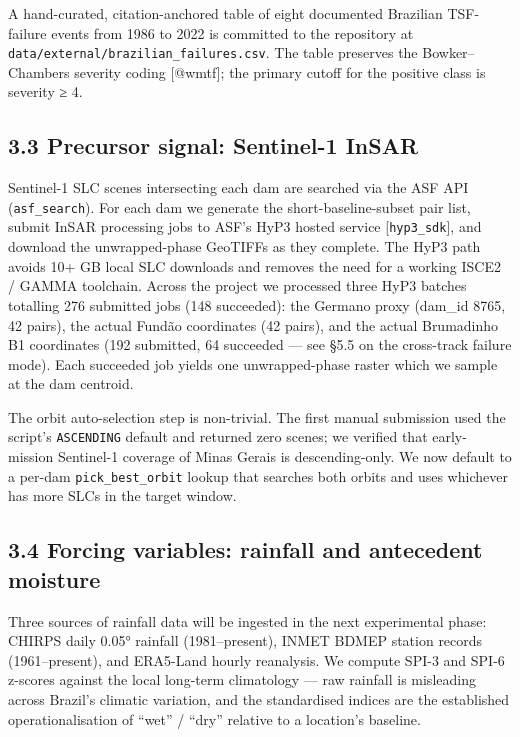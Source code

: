 \documentclass[
  11pt]{article}
\begin{document}
A hand-curated, citation-anchored table of eight documented Brazilian
TSF-failure events from 1986 to 2022 is committed to the repository at
\texttt{data/external/brazilian\_failures.csv}. The table preserves the
Bowker--Chambers severity coding {[}@wmtf{]}; the primary cutoff for the
positive class is severity ≥ 4.

\subsection{3.3 Precursor signal: Sentinel-1
InSAR}\label{precursor-signal-sentinel-1-insar}

Sentinel-1 SLC scenes intersecting each dam are searched via the ASF API
(\texttt{asf\_search}). For each dam we generate the
short-baseline-subset pair list, submit InSAR processing jobs to ASF's
HyP3 hosted service {[}\texttt{hyp3\_sdk}{]}, and download the
unwrapped-phase GeoTIFFs as they complete. The HyP3 path avoids 10+ GB
local SLC downloads and removes the need for a working ISCE2 / GAMMA
toolchain. Across the project we processed three HyP3 batches totalling
276 submitted jobs (148 succeeded): the Germano proxy (dam\_id 8765, 42
pairs), the actual Fundão coordinates (42 pairs), and the actual
Brumadinho B1 coordinates (192 submitted, 64 succeeded --- see §5.5 on
the cross-track failure mode). Each succeeded job yields one
unwrapped-phase raster which we sample at the dam centroid.

The orbit auto-selection step is non-trivial. The first manual
submission used the script's \texttt{ASCENDING} default and returned
zero scenes; we verified that early-mission Sentinel-1 coverage of Minas
Gerais is descending-only. We now default to a per-dam
\texttt{pick\_best\_orbit} lookup that searches both orbits and uses
whichever has more SLCs in the target window.

\subsection{3.4 Forcing variables: rainfall and antecedent
moisture}\label{forcing-variables-rainfall-and-antecedent-moisture}

Three sources of rainfall data will be ingested in the next experimental
phase: CHIRPS daily 0.05° rainfall (1981--present), INMET BDMEP station
records (1961--present), and ERA5-Land hourly reanalysis. We compute
SPI-3 and SPI-6 z-scores against the local long-term climatology --- raw
rainfall is misleading across Brazil's climatic variation, and the
standardised indices are the established operationalisation of ``wet'' /
``dry'' relative to a location's baseline.
\end{document}
